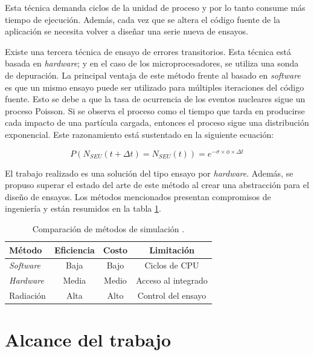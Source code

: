 Esta técnica demanda ciclos de la unidad de proceso y por lo tanto consume más tiempo de ejecución.
Además, cada vez que se altera el código fuente de la aplicación se necesita volver a diseñar una serie nueva de ensayos.

Existe una tercera técnica de ensayo de errores transitorios.
Esta técnica está basada en \emph{hardware}; y en el caso de los microprocesadores, se utiliza una sonda de depuración.
La principal ventaja de este método frente al basado en \emph{software} es que un mismo ensayo puede ser utilizado para múltiples iteraciones del código fuente.
Esto se debe a que la tasa de ocurrencia de los eventos nucleares sigue un proceso Poisson.
Si se observa el proceso como el tiempo que tarda en producirse cada impacto de una partícula cargada, entonces el proceso sigue una distribución exponencial.
Este razonamiento está sustentado en la siguiente ecuación:

\begin{equation}
	\label{eq:poisson}
    P(N_{SEU}(t + \Delta t) = N_{SEU}(t) ) = e^{-\sigma \times \phi \times \Delta t}
\end{equation}

El trabajo realizado es una solución del tipo ensayo por \emph{hardware}.
Además, se propuso superar el estado del arte de este método al crear una abstracción para el diseño de ensayos.
Los métodos mencionados presentan compromisos de ingeniería y están resumidos en la tabla \ref{tab:arte}.

\begin{table}[h]
	\centering
	\caption[Comparación de métodos de simulación]{Comparación de métodos de simulación \citep{ARTICLE:velazco}.}
	\begin{tabular}{l c c c}    
		\toprule
        \textbf{Método}        & \textbf{Eficiencia} & \textbf{Costo} & \textbf{Limitación}\\
		\midrule
        \emph{Software}        & Baja                & Bajo           & Ciclos de CPU\\		
        \emph{Hardware}        & Media               & Medio          & Acceso al integrado\\
        Radiación              & Alta                & Alto           & Control del ensayo\\
		\bottomrule
		\hline
	\end{tabular}
	\label{tab:arte}
\end{table}

\section{Alcance del trabajo}
\label{sec:alcance}

